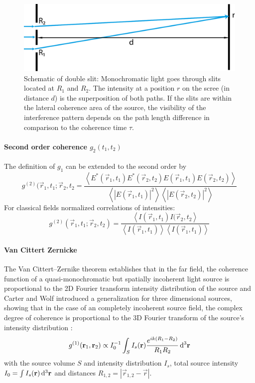 \begin{figure}
	\centering
	\includegraphics[width=0.8\linewidth]{images/doubleslit.pdf}
	\caption[Schematic of double slit]{Schematic of double slit: Monochromatic light goes through slits located at $R_1$ and $R_2$. The intensity at a position $r$ on the scree (in distance $d$) is the superposition of both paths.  If the slits are within the lateral coherence area of the source, the visibility of the interference pattern depends on the path length difference in comparison to the coherence time $\tau$.}
	\label{fig:doubleslit}
\end{figure}


\paragraph{Second order coherence $g_2(t_1,t_2)$}
The definition of $g_1$ can be extended to the second order by
\begin{equation*}
	g^{(2)}(\vec{r}_1,t_1;\vec{r}_2,t_2= 
	\frac{\left< E^*(\vec{r}_1,t_1)E^*(\vec{r}_2,t_2)E(\vec{r}_1,t_1)E(\vec{r}_2,t_2) \right>}{\left<\left | E(\vec{r}_1,t_1)\right |^2 \right> \left< \left |E(\vec{r}_2,t_2)\right |^2 \right>}	
\end{equation*}
For classical fields normalized correlations of intensities:
\begin{equation}
	g^{(2)}(\vec{r}_1,t_1;\vec{r}_2,t_2)= 
		\frac{\left< I(\vec{r}_1,t_1)I(\vec{r}_2,t_2 \right>}{\left<I(\vec{r}_1,t_1)\right>\left<I(\vec{r}_1,t_1)\right>}	
\end{equation}

\paragraph{Van Cittert Zernicke}
The Van Cittert–Zernike theorem establishes that in the far field, the coherence function of a 
quasi-monochromatic but spatially incoherent light source is proportional to the 2D Fourier transform intensity distribution of the source and Carter and Wolf introduced a generalization for three dimensional sources, showing that in the case of an completely incoherent source field, the complex degree of coherence is proportional to the 3D Fourier transform of the source's intensity distribution \cite{rosen1996, goodman200, carter1981}:
\begin{equation}
	g^{(1)}(\mathbf{r}_1,\mathbf{r}_2) \propto I_0^{-1} \int_{S} I_s(\mathbf{r}) \frac{e^{ik(R_1-R_2)}}{R_1 R_2} \operatorname{\mathrm{d}^3 \!} \mathbf{r}
\end{equation}
with the source volume $S$ and intensity distribution $I_s$, total source intensity $I_0=\int I_s(\mathbf{r}) \operatorname{\mathrm{d}^3 \!} \mathbf{r}$ and distances $R_{1,2}=\left|\vec{r}_{1,2}-\vec{r}\right|$. 

